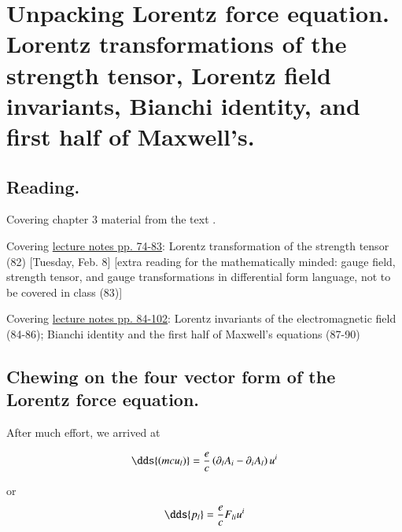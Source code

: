 %
%

\chapter{Unpacking Lorentz force equation.  Lorentz transformations of the strength tensor, Lorentz field invariants, Bianchi identity, and first half of Maxwell's.}
\label{chap:relativisticElectrodynamicsL11}
{}
\date{Feb 9, 2011}

\beginArtWithToc

\section{Reading.}

Covering chapter 3 material from the text \cite{landau1980classical}.

Covering \href{http://www.physics.utoronto.ca/~poppitz/e-poppitz/PHY450_files/RelEMpp74-83.pdf}{lecture notes pp. 74-83}: Lorentz transformation of the strength tensor (82) [Tuesday, Feb. 8] [extra reading for the mathematically minded: gauge field, strength tensor, and gauge transformations in differential form language, not to be covered in class (83)] 

Covering \href{http://www.physics.utoronto.ca/~poppitz/e-poppitz/PHY450_files/RelEMpp84-102.pdf}{lecture notes pp. 84-102}: Lorentz invariants of the electromagnetic field (84-86); Bianchi identity and the first half of Maxwell's equations (87-90)

\section{Chewing on the four vector form of the Lorentz force equation.}

After much effort, we arrived at 

\begin{equation}\label{eqn:relativisticElectrodynamicsL11:10}
\dds{(m c u_l) } = \frac{e}{c} \left( \partial_l A_i - \partial_i A_l \right) u^i
\end{equation}

or
\begin{equation}\label{eqn:relativisticElectrodynamicsL11:30}
\dds{ p_l } = \frac{e}{c} F_{l i} u^i
\end{equation}

